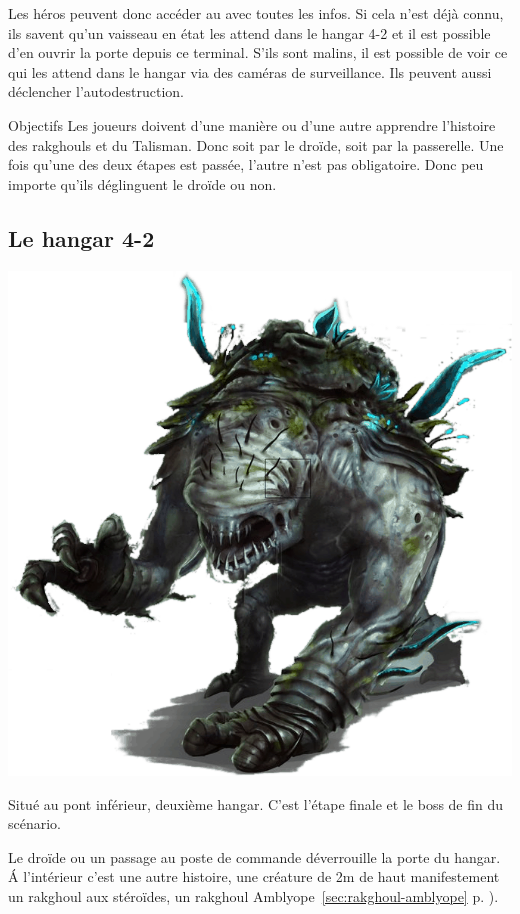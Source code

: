 Les héros peuvent donc accéder au  avec toutes les infos. Si cela n’est déjà connu, ils savent qu’un vaisseau en état les attend dans le hangar 4-2 et il est possible d’en ouvrir la porte depuis ce terminal. S’ils sont malins, il est possible de voir ce qui les attend dans le hangar via des caméras de surveillance. Ils peuvent aussi déclencher l’autodestruction.

\begin{paperbox}{Objectifs}
Les joueurs doivent d’une manière ou d’une autre apprendre l’histoire des rakghouls et du Talisman. Donc soit par le droïde, soit par la passerelle. Une fois qu’une des deux étapes est passée, l’autre n’est pas obligatoire. Donc peu importe qu’ils déglinguent le droïde ou non.
\end{paperbox}

\subsection{Le hangar 4-2}

\noindent\includegraphics[width=\linewidth]{_img/dos-au-muur/rakghoul-amblyope.png}

Situé au pont inférieur, deuxième hangar. C’est l’étape finale et le boss de fin du scénario.

Le droïde ou un passage au poste de commande déverrouille la porte du hangar. \'A l’intérieur c’est une autre histoire, une créature de 2m de haut manifestement un rakghoul aux stéroïdes, un rakghoul Amblyope~\ref{sec:rakghoul-amblyope} p. \pageref{sec:rakghoul-amblyope}).

